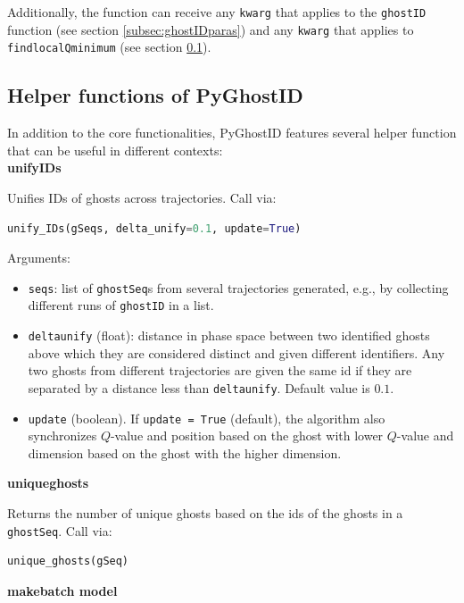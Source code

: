 \documentclass{article}
\theoremstyle{definition}
\begin{document}
\begin{refsection}
Additionally, the function can receive any {\tt kwarg} that applies to the {\tt ghostID} function (see section \ref{subsec:ghostIDparas}) and any {\tt kwarg} that applies to {\tt find\textunderscore local\textunderscore Qminimum} (see section \ref{subsec:helperFunctions}).

\subsection{Helper functions of PyGhostID}\label{subsec:helperFunctions}

In addition to the core functionalities, PyGhostID features several helper function that can be useful in different contexts:\\

\noindent \textbf{unify\textunderscore IDs}

Unifies IDs of ghosts across trajectories. Call via:
\begin{lstlisting}[language=Python]
unify_IDs(gSeqs, delta_unify=0.1, update=True)
\end{lstlisting}

Arguments:
\begin{itemize}
    \item {\tt seqs}: list of {\tt ghostSeq}s from several trajectories generated, e.g., by collecting different runs of {\tt ghostID} in a list.
    \item {\tt delta\textunderscore unify} (float): distance in phase space between two identified ghosts above which they are considered distinct and given different identifiers. Any two ghosts from different trajectories are given the same id if they are separated by a distance less than {\tt delta\textunderscore unify}. Default value is $0.1$. 
    \item {\tt update} (boolean). If {\tt update = True} (default), the algorithm also synchronizes $Q$-value and position based on the ghost with lower $Q$-value and dimension based on the ghost with the higher dimension.    
\end{itemize}

\noindent \textbf{unique\textunderscore ghosts}

Returns the number of unique ghosts based on the ids of the ghosts in a {\tt ghostSeq}. Call via:
\begin{lstlisting}[language=Python]
unique_ghosts(gSeq)
\end{lstlisting}

\noindent \textbf{make\textunderscore batch \textunderscore model}


\end{refsection}
\end{document}

